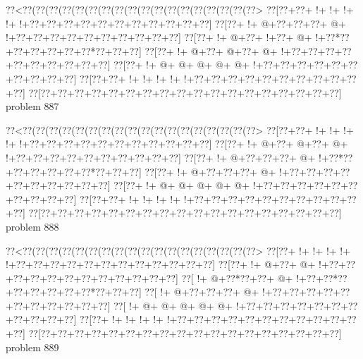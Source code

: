 \vbox{\vbox{\goo
\0??<\0??(\0??(\0??(\0??(\0??(\0??(\0??(\0??(\0??(\0??(\0??(\0??(\0??(\0??(\0??(\0??(\0??(\0??>
\0??[\0??+\0??+\- !+\- !+\- !+\- !+\- !+\0??+\0??+\0??+\0??+\0??+\0??+\0??+\0??+\0??+\0??+\0??]
\0??[\0??+\- !+\- @+\0??+\0??+\0??+\- @+\- !+\0??+\0??+\0??+\0??+\0??+\0??+\0??+\0??+\0??+\0??]
\0??[\0??+\- !+\- @+\0??+\- !+\0??+\- @+\- !+\0??*\0??+\0??+\0??+\0??+\0??+\0??*\0??+\0??+\0??]
\0??[\0??+\- !+\- @+\0??+\- @+\0??+\- @+\- !+\0??+\0??+\0??+\0??+\0??+\0??+\0??+\0??+\0??+\0??]
\0??[\0??+\- !+\- @+\- @+\- @+\- @+\- @+\- !+\0??+\0??+\0??+\0??+\0??+\0??+\0??+\0??+\0??+\0??]
\0??[\0??+\0??+\- !+\- !+\- !+\- !+\- !+\0??+\0??+\0??+\0??+\0??+\0??+\0??+\0??+\0??+\0??+\0??]
\0??[\0??+\0??+\0??+\0??+\0??+\0??+\0??+\0??+\0??+\0??+\0??+\0??+\0??+\0??+\0??+\0??+\0??+\0??]
}
\hfil problem 887\hfil\break
}



\vbox{\vbox{\goo
\0??<\0??(\0??(\0??(\0??(\0??(\0??(\0??(\0??(\0??(\0??(\0??(\0??(\0??(\0??(\0??(\0??(\0??(\0??>
\0??[\0??+\0??+\- !+\- !+\- !+\- !+\- !+\0??+\0??+\0??+\0??+\0??+\0??+\0??+\0??+\0??+\0??+\0??]
\0??[\0??+\- !+\- @+\0??+\- @+\0??+\- @+\- !+\0??+\0??+\0??+\0??+\0??+\0??+\0??+\0??+\0??+\0??]
\0??[\0??+\- !+\- @+\0??+\0??+\0??+\- @+\- !+\0??*\0??+\0??+\0??+\0??+\0??+\0??*\0??+\0??+\0??]
\0??[\0??+\- !+\- @+\0??+\0??+\0??+\- @+\- !+\0??+\0??+\0??+\0??+\0??+\0??+\0??+\0??+\0??+\0??]
\0??[\0??+\- !+\- @+\- @+\- @+\- @+\- @+\- !+\0??+\0??+\0??+\0??+\0??+\0??+\0??+\0??+\0??+\0??]
\0??[\0??+\0??+\- !+\- !+\- !+\- !+\- !+\0??+\0??+\0??+\0??+\0??+\0??+\0??+\0??+\0??+\0??+\0??]
\0??[\0??+\0??+\0??+\0??+\0??+\0??+\0??+\0??+\0??+\0??+\0??+\0??+\0??+\0??+\0??+\0??+\0??+\0??]
}
\hfil problem 888\hfil\break
}



\vbox{\vbox{\goo
\0??<\0??(\0??(\0??(\0??(\0??(\0??(\0??(\0??(\0??(\0??(\0??(\0??(\0??(\0??(\0??(\0??(\0??(\0??>
\0??[\0??+\- !+\- !+\- !+\- !+\- !+\0??+\0??+\0??+\0??+\0??+\0??+\0??+\0??+\0??+\0??+\0??+\0??]
\0??[\0??+\- !+\- @+\0??+\- @+\- !+\0??+\0??+\0??+\0??+\0??+\0??+\0??+\0??+\0??+\0??+\0??+\0??]
\0??[\- !+\- @+\0??*\0??+\0??+\- @+\- !+\0??+\0??*\0??+\0??+\0??+\0??+\0??+\0??*\0??+\0??+\0??]
\0??[\- !+\- @+\0??+\0??+\0??+\- @+\- !+\0??+\0??+\0??+\0??+\0??+\0??+\0??+\0??+\0??+\0??+\0??]
\0??[\- !+\- @+\- @+\- @+\- @+\- @+\- !+\0??+\0??+\0??+\0??+\0??+\0??+\0??+\0??+\0??+\0??+\0??]
\0??[\0??+\- !+\- !+\- !+\- !+\- !+\0??+\0??+\0??+\0??+\0??+\0??+\0??+\0??+\0??+\0??+\0??+\0??]
\0??[\0??+\0??+\0??+\0??+\0??+\0??+\0??+\0??+\0??+\0??+\0??+\0??+\0??+\0??+\0??+\0??+\0??+\0??]
}
\hfil problem 889\hfil\break
}




